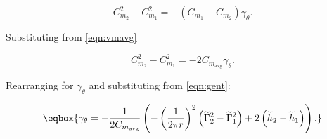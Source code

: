 \begin{equation}
    C_{m_2}^2 - C_{m_1}^2 = -\left(C_{m_1} + C_{m_2}\right) \gamma_\theta.
\end{equation}

\noindent Substituting from \cref{eqn:vmavg}

\begin{equation}
    C_{m_2}^2 - C_{m_1}^2 = -2C_{m_\text{avg}} \gamma_\theta.
\end{equation}

\noindent Rearranging for \(\gamma_\theta\) and substituting from \cref{eqn:gent}:

\begin{equation}
    \label{eqn:gamma_theta_general}
    \eqbox{
        \gamma_\theta = -\frac{1}{2 C_{m_\text{avg}}} \left(- \left(\frac{1}{2 \pi r}\right)^2 \left(\widetilde{\Gamma}_2^2-\widetilde{\Gamma}_1^2\right) + 2 \left( \widetilde{h}_2 - \widetilde{h}_1 \right) \right).
    }
\end{equation}



